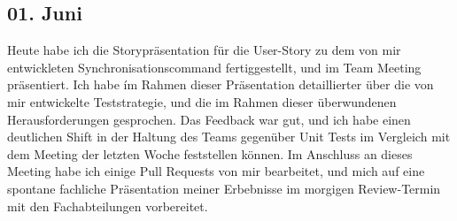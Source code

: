 \subsection{01. Juni}
Heute habe ich die Storypräsentation für die User-Story zu dem von mir entwickleten Synchronisationscommand fertiggestellt, und im Team Meeting präsentiert. Ich habe ím Rahmen dieser Präsentation detaillierter über die von mir entwickelte Teststrategie, und die im Rahmen dieser überwundenen Herausforderungen gesprochen. Das Feedback war gut, und ich habe einen deutlichen Shift in der Haltung des Teams gegenüber Unit Tests im Vergleich mit dem Meeting der letzten Woche feststellen können. Im Anschluss an dieses Meeting habe ich einige Pull Requests von mir bearbeitet, und mich auf eine spontane fachliche Präsentation meiner Erbebnisse im morgigen Review-Termin mit den Fachabteilungen vorbereitet.